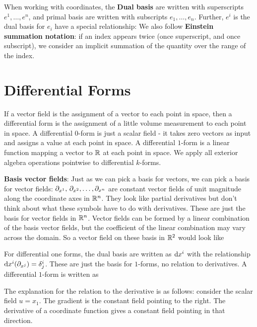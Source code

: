 When working with coordinates, the \textbf{Dual basis} are written with superscripts $e^1,\dotsc,e^n$, and primal basis are written with subscripts $e_1,\dotsc,e_n$. Further, $e^i$ is the dual basis for $e_i$ have a special relationship:
We also follow \textbf{Einstein summation notation}: if an index appears twice (once superscript, and once subscript), we consider an implicit summation of the quantity over the range of the index.


\section{Differential Forms}
If a vector field is the assignment of a vector to each point in space, then a differential form is the assignment of a little volume measurement to each point in space. A differential $0$-form is just a scalar field - it takes zero vectors as input and assigns a value at each point in space. A differential $1$-form is a linear function mapping a vector to $\mathbb{R}$ at each point in space. We apply all exterior algebra operations pointwise to differential $k$-forms.

\textbf{Basis vector fields}: Just as we can pick a basis for vectors, we can pick a basis for vector fields: $\partial_{x^1},\, \partial_{x^2}, \dotsc, \partial_{x^n}$ are constant vector fields of unit magnitude along the coordinate axes in $\mathbb{R}^n$. They look like partial derivatives but don't think about what these symbols have to do with derivatives. These are just the basis for vector fields in $\mathbb{R}^n$. Vector fields can be formed by a linear combination of the basis vector fields, but the coefficient of the linear combination may vary across the domain. So a vector field on these basis in $\mathbb{R}^2$ would look like

For differential one forms, the dual basis are written as $\mathrm{d} x^i$ with the relationship $\mathrm{d} x^i(\partial_{x^j}) = \delta^i_j$. These are just the basis for $1$-forms, no relation to derivatives. A differential $1$-form is written as

The explanation for the relation to the derivative is as follows: consider the scalar field $u = x_1$. The gradient is the constant field pointing to the right. The derivative of a coordinate function gives a constant field pointing in that direction. 
